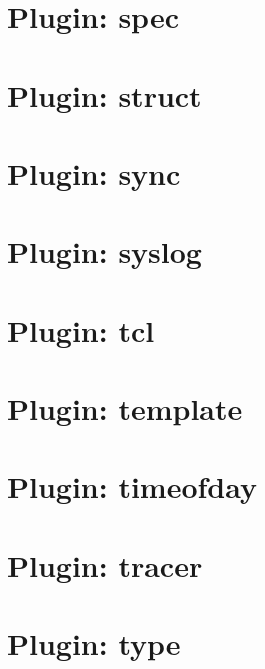 \documentclass[twoside]{book}
\newcommand{\+}{\discretionary{\mbox{\scriptsize$\hookleftarrow$}}{}{}}
\begin{document}
\chapter{Plugin\+: spec}
\label{md_src_plugins_spec_README}

\chapter{Plugin\+: struct}
\label{md_src_plugins_struct_README}

\chapter{Plugin\+: sync}
\label{md_src_plugins_sync_README}

\chapter{Plugin\+: syslog}
\label{md_src_plugins_syslog_README}

\chapter{Plugin\+: tcl}
\label{md_src_plugins_tcl_README}

\chapter{Plugin\+: template}
\label{md_src_plugins_template_README}

\chapter{Plugin\+: timeofday}
\label{md_src_plugins_timeofday_README}

\chapter{Plugin\+: tracer}
\label{md_src_plugins_tracer_README}

\chapter{Plugin\+: type}
\label{md_src_plugins_type_README}

\end{document}
